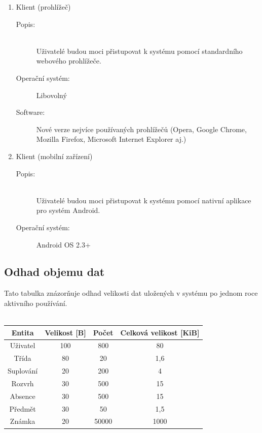 \documentclass[a4paper,10pt,titlepage]{article}
\begin{document}
\begin{enumerate}
\begin{description}
			\end{description}
		\item Klient (prohlížeč)
			\begin{description}
				\item[Popis:] \hfill \\Uživatelé budou moci přistupovat k systému pomocí standardního webového prohlížeče.
				\item[Operační systém:] Libovolný
				\item[Software:] Nové verze nejvíce používaných prohlížečů (Opera, Google Chrome, Mozilla Firefox, Microsoft Internet Explorer aj.)
			\end{description}
		\item Klient (mobilní zařízení)
			\begin{description}
				\item[Popis:] \hfill \\Uživatelé budou moci přistupovat k systému pomocí nativní aplikace pro systém Android.
				\item[Operační systém:] Android OS 2.3+
			\end{description}
		\end{enumerate}
	\subsection{Odhad objemu dat}
		Tato tabulka znázorňuje odhad velikosti dat uložených v systému po jednom roce aktivního používání.
		\\\\
		\begin{tabular}{| c | c | c | c |}
			\hline
			Entita & Velikost [B] & Počet & Celková velikost [KiB] \\ \hline
			Uživatel & 100 & 800 & 80 \\ \hline
			Třída & 80 & 20 & 1,6 \\ \hline
			Suplování & 20 & 200 & 4 \\ \hline
			Rozvrh & 30 & 500 & 15 \\ \hline
			Absence & 30 & 500 & 15 \\ \hline
			Předmět & 30 & 50 & 1,5 \\ \hline
			Známka & 20 & 50000 & 1000 \\
			\hline
		\end{tabular}
\end{document}
